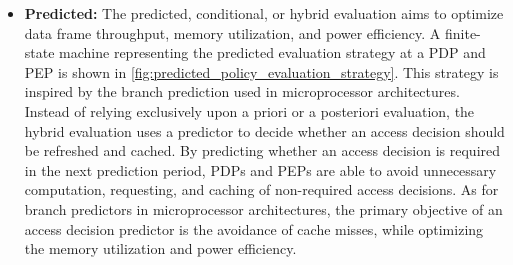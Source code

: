 \begin{itemize}
    \item \textbf{Predicted:} The predicted, conditional, or hybrid evaluation aims to optimize data frame throughput, memory utilization, and power efficiency.
    A finite-state machine representing the predicted evaluation strategy at a PDP and PEP is shown in \autoref{fig:predicted_policy_evaluation_strategy}.
    This strategy is inspired by the branch prediction used in microprocessor architectures.
    Instead of relying exclusively upon a priori or a posteriori evaluation, the hybrid evaluation uses a predictor to decide whether an access decision should be refreshed and cached.
    By predicting whether an access decision is required in the next prediction period, PDPs and PEPs are able to avoid unnecessary computation, requesting, and caching of non-required access decisions.
    As for branch predictors in microprocessor architectures, the primary objective of an access decision predictor is the avoidance of cache misses, while optimizing the memory utilization and power efficiency. 
\end{itemize}
